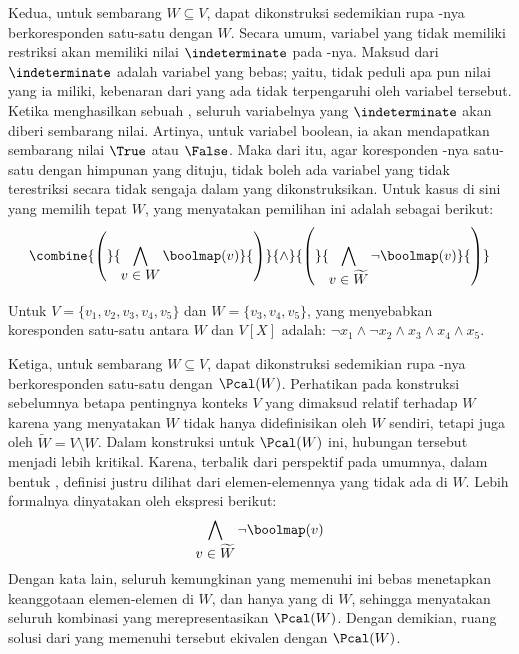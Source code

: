 Kedua, untuk sembarang \(W \subseteq V\), dapat dikonstruksi  sedemikian rupa -nya berkoresponden satu-satu dengan \(W\). Secara umum, variabel yang tidak memiliki restriksi akan memiliki nilai \(\indeterminate\) pada -nya. Maksud dari \(\indeterminate\) adalah variabel yang bebas; yaitu, tidak peduli apa pun nilai yang ia miliki, kebenaran dari  yang ada tidak terpengaruhi oleh variabel tersebut. Ketika  menghasilkan sebuah , seluruh variabelnya yang \(\indeterminate\) akan diberi sembarang nilai. Artinya, untuk variabel boolean, ia akan mendapatkan sembarang nilai \(\True\) atau \(\False\). Maka dari itu, agar koresponden -nya satu-satu dengan himpunan yang dituju, tidak boleh ada variabel yang tidak terestriksi secara tidak sengaja dalam  yang dikonstruksikan. Untuk kasus di sini yang memilih tepat \(W\),  yang menyatakan pemilihan ini adalah sebagai berikut:
\[
	\combine{\left(}
			{\bigwedge \limits_{\displaystyle v \in W} \boolmap(v)}
	{\right)}{\wedge}{\left(}
			{\bigwedge \limits_{\displaystyle v \in \widetilde{W}} \neg \boolmap(v)}
	{\right)}
\]

\begin{example}
	Untuk \(V = \{v_1, v_2, v_3, v_4, v_5\}\) dan \(W = \{v_3, v_4, v_5\}\),  yang menyebabkan koresponden satu-satu antara \(W\) dan \(V[X]\) adalah: \(\neg x_1 \wedge \neg x_2 \wedge x_3 \wedge x_4 \wedge x_5\).
\end{example}

Ketiga, untuk sembarang \(W \subseteq V\), dapat dikonstruksi  sedemikian rupa -nya berkoresponden satu-satu dengan \(\Pcal(W)\). Perhatikan pada konstruksi  sebelumnya betapa pentingnya konteks \(V\) yang dimaksud relatif terhadap \(W\) karena  yang menyatakan \(W\) tidak hanya didefinisikan oleh \(W\) sendiri, tetapi juga oleh \(\widetilde{W} = V \setminus W\). Dalam konstruksi  untuk \(\Pcal(W)\) ini, hubungan tersebut menjadi lebih kritikal. Karena, terbalik dari perspektif  pada umumnya, dalam bentuk , definisi  justru dilihat dari elemen-elemennya yang tidak ada di \(W\). Lebih formalnya dinyatakan oleh ekspresi berikut:
\[
	\bigwedge \limits_{\displaystyle v \in \widetilde{W}} \neg \boolmap(v)
\]
Dengan kata lain, seluruh kemungkinan  yang memenuhi  ini bebas menetapkan keanggotaan elemen-elemen di \(W\), dan hanya yang di \(W\), sehingga menyatakan seluruh kombinasi yang merepresentasikan \(\Pcal(W)\). Dengan demikian, ruang solusi dari  yang memenuhi  tersebut ekivalen dengan \(\Pcal(W)\).

